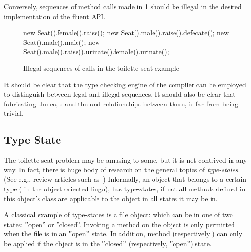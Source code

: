 Conversely, sequences of method calls made in \cref{Figure:toilette:illegal}
  should be illegal in the desired implementation of the fluent API.

\begin{figure}[htbp]
  \begin{JAVA}
new Seat().female().raise();
new Seat().male().raise().defecate();
new Seat().male().male();
new Seat().male().raise().urinate().female().urinate();\end{JAVA}
  \caption{Illegal sequences of calls in the toilette seat example}
  \label{Figure:toilette:illegal}
\end{figure}
It should be clear that the type checking engine of the compiler can
be employed to distinguish between legal and illegal sequences.
It should also be clear that fabricating the es, s
and the  and  relationships between these, is
far from being trivial.

\subsection{Type State}
The toilette seat problem may be amusing to some, but it is not contrived in
any way. In fact, there is huge body of research on the general topics of
\emph{type-states}. (See e.g., review articles such
as~\cite{Aldrich:Sunshine:2009,Bierhoff:Aldrich:2005}) Informally, an object
that belongs to a certain type ( in the object oriented lingo), has
type-states, if not all methods defined in this object's class are applicable
to the object in all states it may be in.

A classical example of type-states is a file object: which can be in one of two
states: ‟open” or ‟closed”. Invoking a  method on the object is only
permitted when the file is in an ‟open” state. In addition, method 
(respectively ) can only be applied if the object is in the
‟closed” (respectively, ‟open”) state.

